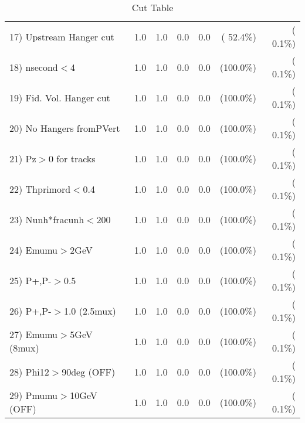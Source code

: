 \begin{table}[h!]
\begin{tabular}{||l||r|r|r|r|r|r||}
 17) Upstream Hanger cut  &          1.0 &          1.0 &          0.0 &          0.0 & ( 52.4\%) & (  0.1\%) \\
 18) nsecond$<$4          &          1.0 &          1.0 &          0.0 &          0.0 & (100.0\%) & (  0.1\%) \\
 19) Fid. Vol. Hanger cut &          1.0 &          1.0 &          0.0 &          0.0 & (100.0\%) & (  0.1\%) \\
 20) No Hangers fromPVert &          1.0 &          1.0 &          0.0 &          0.0 & (100.0\%) & (  0.1\%) \\
 21) Pz$>$0 for tracks    &          1.0 &          1.0 &          0.0 &          0.0 & (100.0\%) & (  0.1\%) \\
 22) Thprimord$<$0.4      &          1.0 &          1.0 &          0.0 &          0.0 & (100.0\%) & (  0.1\%) \\
 23) Nunh*fracunh$<$200   &          1.0 &          1.0 &          0.0 &          0.0 & (100.0\%) & (  0.1\%) \\
 24) Emumu$>$2GeV         &          1.0 &          1.0 &          0.0 &          0.0 & (100.0\%) & (  0.1\%) \\
 25) P+,P-$>$0.5          &          1.0 &          1.0 &          0.0 &          0.0 & (100.0\%) & (  0.1\%) \\
 26) P+,P-$>$1.0 (2.5mux) &          1.0 &          1.0 &          0.0 &          0.0 & (100.0\%) & (  0.1\%) \\
 27) Emumu$>$5GeV  (8mux) &          1.0 &          1.0 &          0.0 &          0.0 & (100.0\%) & (  0.1\%) \\
 28) Phi12$>$90deg  (OFF) &          1.0 &          1.0 &          0.0 &          0.0 & (100.0\%) & (  0.1\%) \\
 29) Pmumu$>$10GeV  (OFF) &          1.0 &          1.0 &          0.0 &          0.0 & (100.0\%) & (  0.1\%) \\
 \hline
 \hline
 \end{tabular}
 \caption{Cut Table           }
 \label{tab-cutcohjpsi-mumu_cohpip}
 \end{table}
